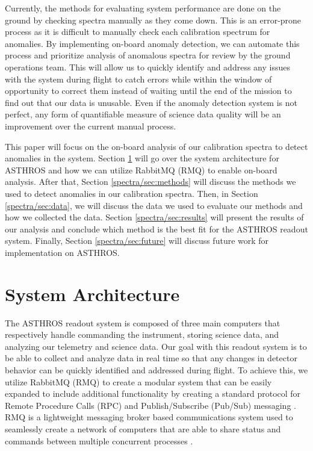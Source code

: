 Currently, the methods for evaluating system performance are done on the ground by checking spectra manually as they come down.
This is an error-prone process as it is difficult to manually check each calibration spectrum for anomalies.
By implementing on-board anomaly detection, we can automate this process and prioritize analysis of anomalous spectra for review by the ground operations team.
This will allow us to quickly identify and address any issues with the system during flight to catch errors while within the window of opportunity to correct them instead of waiting until the end of the mission to find out that our data is unusable.
Even if the anomaly detection system is not perfect, any form of quantifiable measure of science data quality will be an improvement over the current manual process.


This paper will focus on the on-board analysis of our calibration spectra to detect anomalies in the system.
Section \ref{spectra/sec:system} will go over the system architecture for ASTHROS and how we can utilize RabbitMQ (RMQ) to enable on-board analysis.
After that, Section \ref{spectra/sec:methods} will discuss the methods we used to detect anomalies in our calibration spectra.
Then, in Section \ref{spectra/sec:data}, we will discuss the data we used to evaluate our methods and how we collected the data.
Section \ref{spectra/sec:results} will present the results of our analysis and conclude which method is the best fit for the ASTHROS readout system.
Finally, Section \ref{spectra/sec:future} will discuss future work for implementation on ASTHROS. 

\section{System Architecture}
\label{spectra/sec:system}
The ASTHROS readout system is composed of three main computers that respectively handle commanding the instrument, storing science data, and analyzing our telemetry and science data. 
Our goal with this readout system is to be able to collect and analyze data in real time so that any changes in detector behavior can be quickly identified and addressed during flight. 
To achieve this, we utilize RabbitMQ (RMQ) to create a modular system that can be easily expanded to include additional functionality by creating a standard protocol for Remote Procedure Calls (RPC) and Publish/Subscribe (Pub/Sub) messaging \parencite{dobbelaere2017kafkaversusrabbitmq}.
RMQ is a lightweight messaging broker based communications system used to seamlessly create a network of computers that are able to share status and commands between multiple concurrent processes \parencite{thompson2024architecture}.

